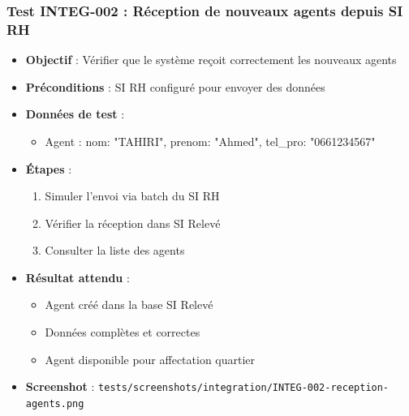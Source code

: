 \subsubsection{Test INTEG-002 : Réception de nouveaux agents depuis SI RH}
\begin{itemize}
    \item \textbf{Objectif} : Vérifier que le système reçoit correctement les nouveaux agents
    \item \textbf{Préconditions} : SI RH configuré pour envoyer des données
    \item \textbf{Données de test} :
        \begin{itemize}
            \item Agent : {nom: "TAHIRI", prenom: "Ahmed", tel\_pro: "0661234567"}
        \end{itemize}
    \item \textbf{Étapes} :
        \begin{enumerate}
            \item Simuler l'envoi via batch du SI RH
            \item Vérifier la réception dans SI Relevé
            \item Consulter la liste des agents
        \end{enumerate}
    \item \textbf{Résultat attendu} : 
        \begin{itemize}
            \item Agent créé dans la base SI Relevé
            \item Données complètes et correctes
            \item Agent disponible pour affectation quartier
        \end{itemize}
    \item \textbf{Screenshot} : \texttt{tests/screenshots/integration/INTEG-002-reception-agents.png}
\end{itemize}

